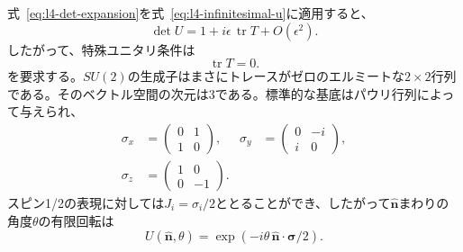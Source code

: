 式~\eqref{eq:l4-det-expansion}を式~\eqref{eq:l4-infinitesimal-u}に適用すると、
\begin{equation}
\det U
=1+i\epsilon\,\operatorname{tr}T+O(\epsilon^2).
\end{equation}
したがって、特殊ユニタリ条件は
\begin{equation}
\operatorname{tr}T=0.
\label{eq:l4-traceless-generator}
\end{equation}
を要求する。\(SU(2)\)の生成子はまさにトレースがゼロのエルミートな\(2\times2\)行列である。そのベクトル空間の次元は3である。標準的な基底はパウリ行列によって与えられ、
\begin{equation}
\begin{aligned}
\sigma_x&=
\begin{pmatrix}0&1\\1&0\end{pmatrix},
&
\sigma_y&=
\begin{pmatrix}0&-i\\i&0\end{pmatrix},
\\[0.4em]
\sigma_z&=
\begin{pmatrix}1&0\\0&-1\end{pmatrix}.
\end{aligned}
\end{equation}
スピン1/2の表現に対しては\(J_i=\sigma_i/2\)ととることができ、したがって\(\hat{\boldsymbol n}\)まわりの角度\(\theta\)の有限回転は
\begin{equation}
U(\hat{\boldsymbol n},\theta)
=\exp\!\left(-i\theta\,
\hat{\boldsymbol n}\cdot\boldsymbol\sigma/2\right).
\end{equation}

\begin{classroomqa}
\end{classroomqa}

\begin{classroomqa}
\end{classroomqa}

